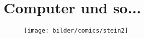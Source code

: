 \section{Computer und so...}

\newpage



\begin{figure}[h]
  \texttt{[image: bilder/comics/stein2]}
\end{figure}

